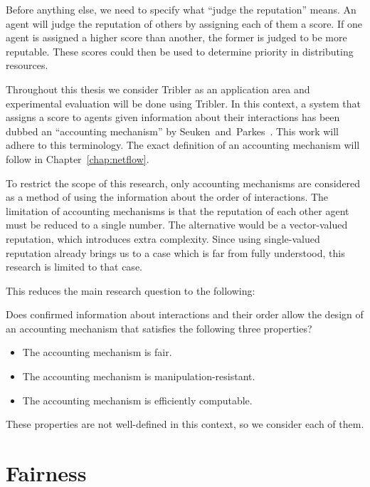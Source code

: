 \documentclass[a4paper,11pt]{book}
\theoremstyle{definition}
\begin{document}
Before anything else, we need to specify what ``judge the reputation'' means.
An agent will judge the reputation of others by assigning each of them a score.
If one agent is assigned a higher score than another, the former is judged to be more
reputable.  These scores could then be used to determine priority in distributing resources.

Throughout this thesis we consider Tribler as an application area and experimental
evaluation will be done using Tribler. 
In this context, a system that assigns a score
to agents given information about their interactions has been dubbed an 
``accounting mechanism'' by Seuken~and~Parkes~\cite{seuken2010accounting}. This
work will adhere to this terminology. The exact definition of an accounting mechanism
will follow in Chapter~\ref{chap:netflow}. 

To restrict the scope of this research, only accounting mechanisms are considered as a method
of using the information about the order of interactions. The limitation of accounting mechanisms
is that the reputation of each other agent must be reduced to a single number. The alternative
would be a vector-valued reputation, which introduces extra complexity. Since using single-valued
reputation already brings us to a case which is far from fully understood, this research is limited
to that case.

This reduces the main research question
to the following:

\begin{center}
    Does confirmed information about interactions and their order allow the design of an accounting mechanism
    that satisfies the following three properties?
\end{center}

\begin{itemize}
    \item The accounting mechanism is fair. 
    \item The accounting mechanism is manipulation-resistant.
    \item The accounting mechanism is efficiently computable.
\end{itemize}

These properties are not well-defined in this context, so we consider each of them.

\section{Fairness}
\end{document}
